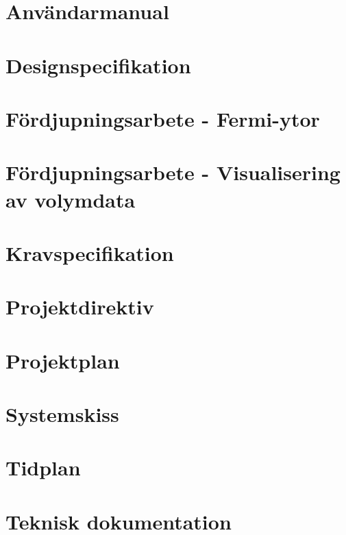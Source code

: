 \documentclass[a4paper,12pt]{article}
\begin{document}
\begin{appendices}

\section{Användarmanual}
\label{appendix:användarmanual}

\section{Designspecifikation}
\label{appendix:designspecifikation}

\section{Fördjupningsarbete - Fermi-ytor}
\label{appendix:fermi-ytor}

\section{Fördjupningsarbete - Visualisering av volymdata}
\label{appendix:visualisering}

\section{Kravspecifikation}
\label{appendix:kravspecifikation}

\section{Projektdirektiv}
\label{appendix:projektdirektiv}

\section{Projektplan}
\label{appendix:projektplan}


\section{Systemskiss}
\label{appendix:systemskiss}

\section{Tidplan}
\label{appendix:tidplan}

\section{Teknisk dokumentation}
\label{appendix:teknisk-dokumentation}


\end{appendices}
\end{document}
